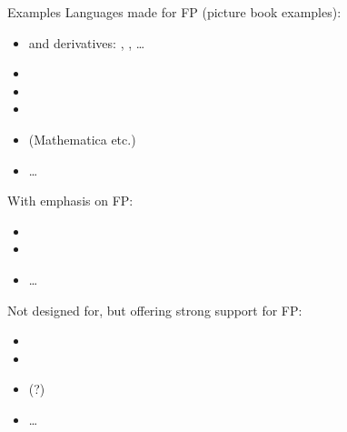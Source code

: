 \begin{frame}{Examples}
	Languages made for FP (picture book examples):
	\begin{itemize}
		\item {} and derivatives: , , \dots
		\item {}
		\item {}
		\item {}
		\item {} (Mathematica etc.)
		\item \dots
	\end{itemize}
	With emphasis on FP:
	\begin{itemize}
		\item {}
		\item {}
		\item \dots
	\end{itemize}
	Not designed for, but offering strong support for FP:
	\begin{itemize}
		\item {} 
		\item {}
		\item {} (?)  
		\item \dots
	\end{itemize}
\end{frame}

%	
%

